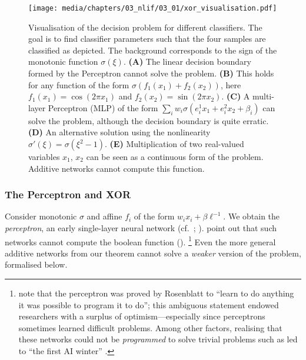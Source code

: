 \begin{figure}
	\centering
	\texttt{[image: media/chapters/03\_nlif/03\_01/xor\_visualisation.pdf]}%
	{\label{fig:xor_visualisation_a}}%
	{\label{fig:xor_visualisation_b}}%
	{\label{fig:xor_visualisation_c}}%
	{\label{fig:xor_visualisation_d}}%
	{\label{fig:xor_visualisation_e}}%
	\caption[Visualisation of the XOR decision problem for different classifiers]{Visualisation of the \XOR decision problem for different classifiers. The goal is to find classifier parameters such that the four samples are classified as depicted.
	The background corresponds to the sign of the monotonic function $\sigma(\xi)$.
	\textbf{(A)} The linear decision boundary formed by the Perceptron cannot solve the \XOR problem.
	\textbf{(B)} This holds for any function of the form $\sigma(f_1(x_1) + f_2(x_2))$, here $f_1(x_1) = \cos(2\pi x_1)$ and $f_2(x_2) = \sin(2\pi x_2)$.
	\textbf{(C)} A multi-layer Perceptron (MLP) of the form $\sum_i w_i \sigma(e_i^1 x_1 + e_i^2 x_2 + \beta_i )$ can solve the problem, although the decision boundary is quite erratic.
	\textbf{(D)} An alternative solution using the nonlinearity $\sigma'(\xi) = \sigma(\xi^2 - 1)$.
	\textbf{(E)} Multiplication of two real-valued variables $x_1$, $x_2$ can be seen as a continuous form of the \XOR problem.
	Additive networks cannot compute this function.
	}
	\label{fig:xor_visualisation}
\end{figure}

\subsubsection{The Perceptron and XOR}
Consider monotonic $\sigma$ and affine $f_i$ of the form $w_i x_i + \beta \ell^{-1}$.
We obtain the \emph{perceptron}, an early single-layer neural network (cf.~; \cite{rosenblatt1958perceptron}).
 point out that such networks cannot compute the boolean \XOR function ().%
\footnote{ note that the perceptron was proved by Rosenblatt to \enquote{learn to do anything it was possible to program it to do}; this ambiguous statement endowed researchers with a surplus of optimism---especially since perceptrons sometimes learned difficult problems.
Among other factors, realising that these networks could not be \emph{programmed} to solve trivial problems such as \XOR led to \enquote{the first AI winter} \citep[e.g.,][]{muthukrishnan2020brief}.}
Even the more general additive networks from our theorem cannot solve a \emph{weaker} version of the \XOR problem, formalised below.

